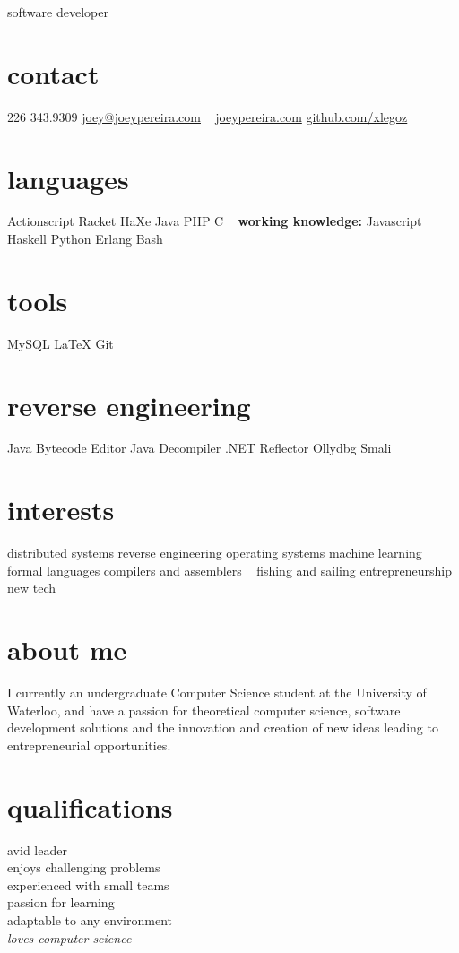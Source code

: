 \documentclass[]{friggeri-cv}
\begin{document}
       {software developer}

\begin{aside}
  \section{contact}
    226 343.9309
    \href{mailto:joey@joeypereira.com}{joey@joeypereira.com}
    ~
    \href{http://joeypereira.com}{joeypereira.com}
    \href{http://www.github.com/xlegoz}{github.com/xlegoz}
  \section{languages}
	Actionscript
	Racket
	HaXe
	Java
	PHP
	C
	~
	\textbf{working knowledge:}
	Javascript
	Haskell
	Python
	Erlang
	Bash	
  \section{tools}
    MySQL
    \LaTeX
	Git
  \section{reverse engineering}
  	Java Bytecode Editor
  	Java Decompiler
  	.NET Reflector
  	Ollydbg
  	Smali
  \section{interests}
  	distributed systems
  	reverse engineering
  	operating systems
  	machine learning
  	formal languages
  	compilers and assemblers
  	~
  	fishing and sailing
  	entrepreneurship
  	new tech
\end{aside}


\section{about me}
I currently an undergraduate Computer Science student at the University of Waterloo, and have a passion for theoretical computer science, software development solutions and the innovation and creation of new ideas leading to entrepreneurial opportunities.
\section{qualifications}
\begin{multicols}{3}
 avid leader \\ enjoys challenging problems \\ experienced with small teams \\ passion for learning \\ adaptable to any environment \\ \em{loves} computer science
\end{multicols}
\end{document}
